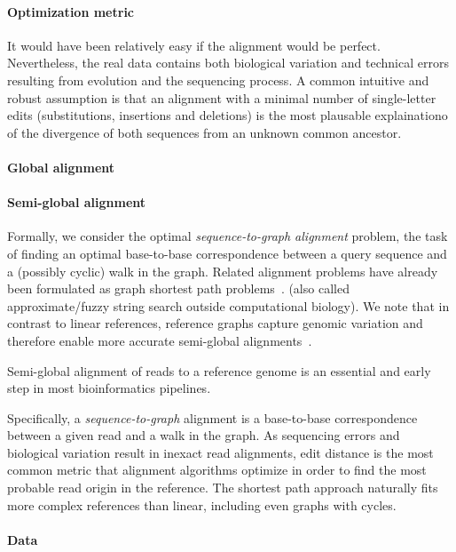 \paragraph{Optimization metric}
It would have been relatively easy if the alignment would be perfect.
Nevertheless, the real data contains both biological variation and technical
errors resulting from evolution and the sequencing process. A common intuitive
and robust assumption is that an alignment with a minimal number of
single-letter edits (substitutions, insertions and deletions) is the most
plausable explainationo of the divergence of both sequences from an unknown
common ancestor.

\paragraph{Global alignment}

\paragraph{Semi-global alignment}
Formally, we consider the optimal \emph{sequence-to-graph alignment} problem,
the task of finding an optimal base-to-base correspondence between a query
sequence and a (possibly cyclic) walk in the graph. Related alignment problems
have already been formulated as graph shortest path
problems~\cite{jain_complexity_2019}.
 (also called approximate/fuzzy string search outside computational
biology).
We note that in contrast to linear references, reference graphs capture genomic
variation and therefore enable more accurate semi-global
alignments~\citep{garrison_variation_2018}.

Semi-global alignment of reads to a reference genome is an essential and early
step in most bioinformatics pipelines.

Specifically, a \emph{sequence-to-graph} alignment is a base-to-base
correspondence between a given read and a walk in the graph. As sequencing
errors and biological variation result in inexact read alignments, edit distance
is the most common metric that alignment algorithms optimize in order to find
the most probable read origin in the reference. The shortest path approach
naturally fits more complex references than linear, including even graphs with
cycles.

\paragraph{Data}


